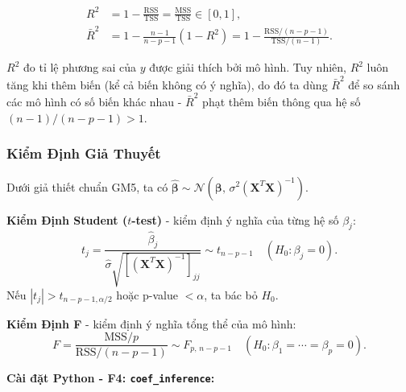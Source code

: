 \begin{tcolorbox}[mycodebox, colback=blue!3!white, colframe=blue!40!black,
    title={\textbf{Định nghĩa 1.3} - Hệ Số Xác Định}]
\begin{align}
    R^2 &= 1 - \frac{\mathrm{RSS}}{\mathrm{TSS}}
         = \frac{\mathrm{MSS}}{\mathrm{TSS}} \in [0, 1],
    \label{eq:r2} \\
    \bar{R}^2 &= 1 - \frac{n-1}{n-p-1}(1 - R^2)
               = 1 - \frac{\mathrm{RSS}/(n-p-1)}{\mathrm{TSS}/(n-1)}.
    \label{eq:r2_adj}
\end{align}
\end{tcolorbox}

$R^2$ đo tỉ lệ phương sai của $y$ được giải thích bởi mô hình. Tuy nhiên,
$R^2$ luôn tăng khi thêm biến (kể cả biến không có ý nghĩa), do đó ta dùng
$\bar{R}^2$ để so sánh các mô hình có số biến khác nhau - $\bar{R}^2$ phạt
thêm biến thông qua hệ số $(n-1)/(n-p-1) > 1$.

\subsubsection{Kiểm Định Giả Thuyết}

Dưới giả thiết chuẩn GM5, ta có
$\hat{\boldsymbol{\beta}} \sim \mathcal{N}(\boldsymbol{\beta},\,
\sigma^2(\mathbf{X}^T\mathbf{X})^{-1})$.

\medskip
\noindent\textbf{Kiểm Định Student ($t$-test)} - kiểm định ý nghĩa của
từng hệ số $\beta_j$:
\begin{equation}
    t_j = \frac{\hat{\beta}_j}{\hat{\sigma}\sqrt{[(\mathbf{X}^T\mathbf{X})^{-1}]_{jj}}}
        \sim t_{n-p-1}
    \quad (H_0 : \beta_j = 0).
    \label{eq:t_test}
\end{equation}
Nếu $|t_j| > t_{n-p-1, \alpha/2}$ hoặc p-value $< \alpha$, ta bác bỏ $H_0$.

\medskip
\noindent\textbf{Kiểm Định F} - kiểm định ý nghĩa tổng thể của mô hình:
\begin{equation}
    F = \frac{\mathrm{MSS}/p}{\mathrm{RSS}/(n-p-1)}
      \sim F_{p,\, n-p-1}
    \quad (H_0 : \beta_1 = \cdots = \beta_p = 0).
    \label{eq:f_test}
\end{equation}

\textbf{Cài đặt Python - F4: \texttt{coef\_inference}:}


